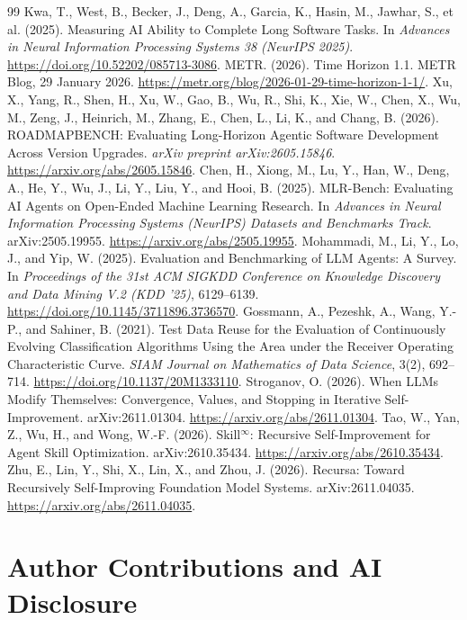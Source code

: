 \documentclass[11pt,a4paper]{article}
\begin{document}
\begin{thebibliography}{99}
 Kwa, T., West, B.,
Becker, J., Deng, A., Garcia, K., Hasin, M.,
Jawhar, S., et al. (2025).
Measuring AI Ability to Complete Long Software Tasks.
In \emph{Advances in Neural Information Processing
Systems 38 (NeurIPS 2025)}.
\url{https://doi.org/10.52202/085713-3086}.
 METR. (2026). Time Horizon 1.1. METR Blog, 29 January 2026. \url{https://metr.org/blog/2026-01-29-time-horizon-1-1/}.
 Xu, X., Yang, R., Shen, H., Xu, W., Gao, B., Wu, R., Shi, K., Xie, W., Chen, X., Wu, M., Zeng, J., Heinrich, M., Zhang, E., Chen, L., Li, K., and Chang, B. (2026). ROADMAPBENCH: Evaluating Long-Horizon Agentic Software Development Across Version Upgrades. \emph{arXiv preprint arXiv:2605.15846}. \url{https://arxiv.org/abs/2605.15846}.
 Chen, H., Xiong, M., Lu, Y., Han, W., Deng, A., He, Y., Wu, J., Li, Y., Liu, Y., and Hooi, B. (2025). MLR-Bench: Evaluating AI Agents on Open-Ended Machine Learning Research. In \emph{Advances in Neural Information Processing Systems (NeurIPS) Datasets and Benchmarks Track}. arXiv:2505.19955. \url{https://arxiv.org/abs/2505.19955}.
 Mohammadi, M., Li, Y., Lo, J., and Yip, W. (2025). Evaluation and Benchmarking of LLM Agents: A Survey. In \emph{Proceedings of the 31st ACM SIGKDD Conference on Knowledge Discovery and Data Mining V.2 (KDD '25)}, 6129--6139. \url{https://doi.org/10.1145/3711896.3736570}.
 Gossmann, A., Pezeshk, A., Wang, Y.-P., and Sahiner, B. (2021). Test Data Reuse for the Evaluation of Continuously Evolving Classification Algorithms Using the Area under the Receiver Operating Characteristic Curve. \emph{SIAM Journal on Mathematics of Data Science}, 3(2), 692--714. \url{https://doi.org/10.1137/20M1333110}.
 Stroganov, O. (2026). When LLMs Modify Themselves: Convergence, Values, and Stopping in Iterative Self-Improvement. arXiv:2611.01304. \url{https://arxiv.org/abs/2611.01304}.
 Tao, W., Yan, Z., Wu, H., and Wong, W.-F. (2026). Skill$^{\infty}$: Recursive Self-Improvement for Agent Skill Optimization. arXiv:2610.35434. \url{https://arxiv.org/abs/2610.35434}.
 Zhu, E., Lin, Y., Shi, X., Lin, X., and Zhou, J. (2026). Recursa: Toward Recursively Self-Improving Foundation Model Systems. arXiv:2611.04035. \url{https://arxiv.org/abs/2611.04035}.
\end{thebibliography}

\section*{Author Contributions and AI Disclosure}
\end{document}
